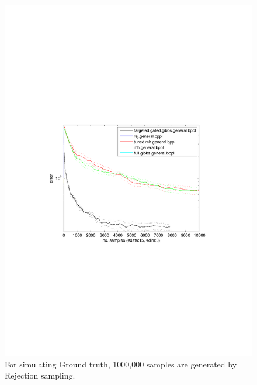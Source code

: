 \begin{figure}%
\centering
\includegraphics[width=1.2\textwidth]{pic1/errVsamplesdata15Dim8.pdf}
\caption{\footnotesize For simulating Ground truth, 1000,000 samples are generated by Rejection sampling. }
\label{fig:pref}
\end{figure}


